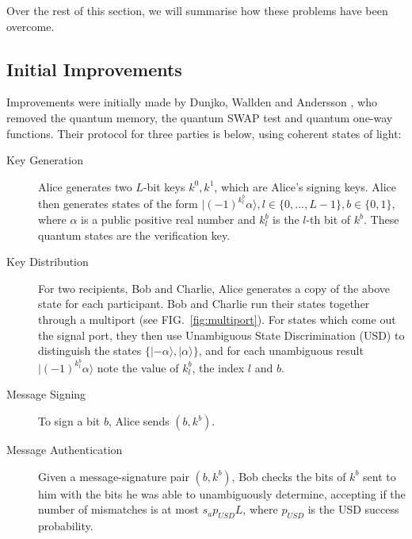 \documentclass[%
 reprint,
 amsmath,amssymb,
 aps,
 pra,
]{revtex4-1}
\begin{document}
Over the rest of this section, we will summarise how these problems have been overcome.

\subsection{Initial Improvements}
\label{ssec:no-qmem}

Improvements were initially made by Dunjko, Wallden and Andersson \cite{PhysRevLett.112.040502}, who removed the quantum memory, the quantum SWAP test and quantum one-way functions. Their protocol for three parties is below, using coherent states of light:

\begin{description}
\item[Key Generation]Alice generates two $L$-bit keys $k^0, k^1$, which are Alice's signing keys. Alice then generates states of the form $|(-1)^{k^b_l}\alpha\rangle, l \in \{0,...,L-1\}, b \in \{0, 1\}$, where $\alpha$ is a public  positive real number and $k^b_l$ is the $l$-th bit of $k^b$. These quantum states are the verification key.
\item[Key Distribution]For two recipients, Bob and Charlie, Alice generates a copy of the above state for each participant. Bob and Charlie run their states together through a multiport (see FIG.\ \ref{fig:multiport}). For states which come out the signal port, they then use Unambiguous State Discrimination (USD) \cite{Ivanovic1987257} to distinguish the states $\{|-\alpha\rangle, |\alpha\rangle\}$, and for each unambiguous result $|(-1)^{k^b_l}\alpha\rangle$ note the value of $k^b_l$, the index $l$ and $b$.
\item[Message Signing]To sign a bit $b$, Alice sends $(b, k^b)$.
\item[Message Authentication]Given a message-signature pair $(b, k^b)$, Bob checks the bits of $k^b$ sent to him with the bits he was able to unambiguously determine, accepting if the number of mismatches is at most $s_ap_{USD}L$, where $p_{USD}$ is the USD success probability.
\end{description}
\end{document}
